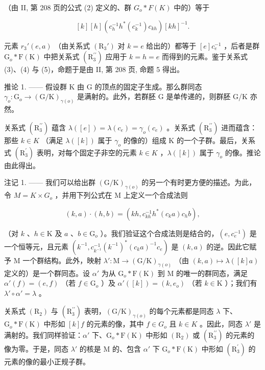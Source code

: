 （由 II, 第 208 页的公式 (2) 定义的、群 \(G_{o} * F(K)\) 中的）等于

\[
[ k ] [ h ] (c _ {h} ^ {- 1} h ^ {*} (c _ {k} ^ {- 1}) c _ {k h}) [ k h ] ^ {- 1}.\tag{5}
\]

元素 \(r_3'(e, a)\) （由关系式 \((\mathrm{R}_3')\) 对 \(k = e\) 给出的）都等于 \([e]c_e^{-1}\) ，后者是群 \(\mathrm{G}_o * \mathrm{F}(\mathrm{K})\) 中把关系式 \((\mathrm{R}_{3}^{\prime\prime})\) 应用于 \(k = h = e\) 而得到的元素。鉴于关系式 (3)、(4) 与 (5)，命题于是由 II, 第 208 页, 命题 5 得出。

推论 1. —— 假设群 K 由 G 的顶点的固定子生成。那么群同态 \(\gamma_{o}\colon\mathrm{G}_{o}\to(\mathrm{G}/\mathrm{K})_{\gamma(o)}\) 是满射的。此外，若群胚 G 是单传递的，则群胚 G/K 亦然。

关系式 \((\mathrm{R}_{3}^{\prime\prime})\) 蕴含 \(\lambda([e]) = \lambda(c_{e}) = \gamma_{o}(c_{e})\) 。关系式 \((\mathrm{R}_{3}^{\prime\prime})\) 进而蕴含：那些 \(k \in K\) （满足 \(\lambda([k])\) 属于 \(\gamma_{o}\) 的像的）组成 K 的一个子群。最后，关系式 \((\mathrm{R}_{3}^{\prime})\) 表明，对每个固定子非空的元素 \(k \in K\) ，\(\lambda([k])\) 属于 \(\gamma_{o}\) 的像。推论由此得出。

注记 1. —— 我们可以给出群 \((\mathrm{G}/\mathrm{K})_{\gamma(o)}\) 的另一个有时更方便的描述。为此，令 \(M = K \times G_{o}\) ，并用下列公式在 M 上定义一个合成法则

\[
(k, a) \cdot (h, b) = (k h, c _ {k h} ^ {- 1} h ^ {*} (c _ {k} a) c _ {h} b),
\]

（对 \(k\) 、\(h \in \mathrm{K}\) 及 \(a\) 、\(b \in \mathrm{G}_o\) ）。我们验证这个合成法则是结合的，\((e, c_e^{-1})\) 是一个恒等元，且元素 \((k^{-1}, c_{k^{-1}}^{-1}(k^{-1})^*(c_k a)^{-1} c_e)\) 是 \((k, a)\) 的逆。因此它赋予 M 一个群结构。此外，映射 \(\lambda'\colon \mathrm{M} \to (\mathrm{G} / \mathrm{K})_{\gamma(o)}\) （由 \((k, a) \mapsto \lambda([k]a)\) 定义的）是一个群同态。设 \(\alpha'\) 为从 \(\mathrm{G}_o * \mathrm{F}(\mathrm{K})\) 到 M 的唯一的群同态，满足 \(\alpha'(f) = (e, f)\) （若 \(f \in \mathrm{G}_o\) ）及 \(\alpha'([k]) = (k, e_o)\) （若 \(k \in \mathrm{K}\) ）；我们有 \(\lambda' \circ \alpha' = \lambda\) 。

关系式 \((\mathrm{R}_{2})\) 与 \((\mathrm{R}_{3}^{\prime\prime})\) 表明，\((\mathrm{G}/\mathrm{K})_{\gamma(o)}\) 的每个元素都是同态 \(\lambda\) 下、\(\mathrm{G}_{o}*\mathrm{F}(\mathrm{K})\) 中形如 \([k]f\) 的元素的像，其中 \(f\in G_{o}\) 且 \(k\in K\) 。因此，同态 \(\lambda'\) 是满射的。我们同样验证：\(\alpha'\) 下、\(\mathrm{G}_{o}*\mathrm{F}(\mathrm{K})\) 中形如 \((\mathrm{R}_{2})\) 或 \((\mathrm{R}_{3}^{\prime\prime})\) 的元素的像为零。于是，同态 \(\lambda'\) 的核是 M 的、包含 \(\alpha'\) 下 \(\mathrm{G}_{o}*\mathrm{F}(\mathrm{K})\) 中形如 \((\mathrm{R}_{3}^{\prime})\) 的元素的像的最小正规子群。

